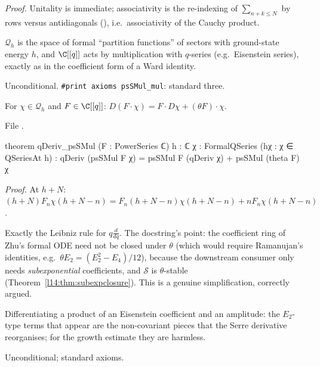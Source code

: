 \noindent\emph{Proof.} Unitality is immediate; associativity is the re-indexing of $\sum_{n+k\le N}$ by rows versus
antidiagonals (), i.e.\ associativity of the Cauchy product.
\begin{physics}
$\mathcal Q_h$ is the space of formal ``partition functions'' of sectors with ground-state energy $h$, and $\C[[q]]$ acts by
multiplication with $q$-series (e.g.\ Eisenstein series), exactly as in the coefficient form of a Ward identity.
\end{physics}
\begin{status}
Unconditional. \texttt{\#print axioms psSMul\_mul}: standard three.
\end{status}

\begin{theorem}\label{l14:thm:productrule}
For $\chi\in\mathcal Q_h$ and $F\in\C[[q]]$: $D(F\cdot\chi) = F\cdot D\chi + (\theta F)\cdot\chi$.
\end{theorem}
\noindent File .
\begin{leancode}
theorem qDeriv_psSMul (F : PowerSeries ℂ) {h : ℂ} {χ : FormalQSeries} (hχ : χ ∈ QSeriesAt h) :
    qDeriv (psSMul F χ) = psSMul F (qDeriv χ) + psSMul (theta F) χ
\end{leancode}
\noindent\emph{Proof.} At $h+N$: $(h+N)F_n\chi(h+N-n) = F_n(h+N-n)\chi(h+N-n) + nF_n\chi(h+N-n)$.
\begin{dictionary}
Exactly the Leibniz rule for $q\frac d{dq}$. The docstring's point: the coefficient ring of Zhu's formal ODE need not be
closed under $\theta$ (which would require Ramanujan's identities, e.g.\ $\theta E_2 = (E_2^2-E_4)/12$), because the
downstream consumer only needs \emph{subexponential} coefficients, and $\mathcal S$ is $\theta$-stable
(Theorem~\ref{l14:thm:subexpclosure}). This is a genuine simplification, correctly argued.
\end{dictionary}
\begin{physics}
Differentiating a product of an Eisenstein coefficient and an amplitude: the $E_2$-type terms that appear are the
non-covariant pieces that the Serre derivative reorganises; for the growth estimate they are harmless.
\end{physics}
\begin{status}
Unconditional; standard axioms.
\end{status}

